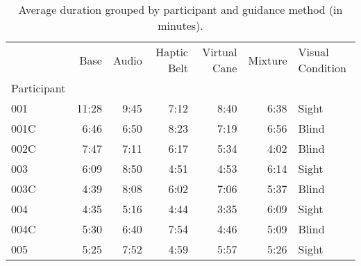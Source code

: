 
\begin{table}[!htb]
\centering
\caption{Average duration grouped by participant and guidance method (in minutes).}
\label{tab:duracao_average_scene}
\begin{tabular}{lrrrrrl}
\toprule
{} &   Base & Audio & Haptic Belt & Virtual Cane & Mixture & Visual Condition \\
Participant &        &       &             &              &         &                  \\
\midrule
001         &  11:28 &  9:45 &        7:12 &         8:40 &    6:38 &            Sight \\
001C        &   6:46 &  6:50 &        8:23 &         7:19 &    6:56 &            Blind \\
002C        &   7:47 &  7:11 &        6:17 &         5:34 &    4:02 &            Blind \\
003         &   6:09 &  8:50 &        4:51 &         4:53 &    6:14 &            Sight \\
003C        &   4:39 &  8:08 &        6:02 &         7:06 &    5:37 &            Blind \\
004         &   4:35 &  5:16 &        4:44 &         3:35 &    6:09 &            Sight \\
004C        &   5:30 &  6:40 &        7:54 &         4:46 &    5:09 &            Blind \\
005         &   5:25 &  7:52 &        4:59 &         5:57 &    5:26 &            Sight \\
\bottomrule
\end{tabular}
\end{table}

